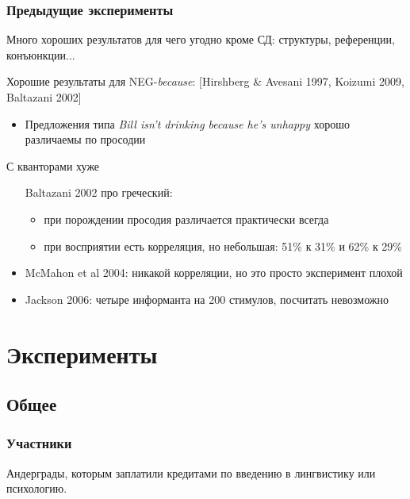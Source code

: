 \documentclass{beamer}
\begin{document}




\begin{frame}
    \frametitle{Предыдущие эксперименты}

    Много хороших результатов для чего угодно кроме СД: структуры, референции, конъюнкции...

    Хорошие результаты для NEG-\textit{because}: [Hirshberg \& Avesani 1997, Koizumi 2009, Baltazani 2002]
    \begin{itemize}
        \item Предложения типа \textit{Bill isn't drinking because he's unhappy} хорошо различаемы по просодии
    \end{itemize}
        
    С кванторами хуже
    \begin{itemize}
        \item [Baltazani 2002] про греческий:
        \begin{itemize}
            \item при порождении просодия различается практически всегда
            \item при восприятии есть корреляция, но небольшая: 51\% к 31\% и 62\% к 29\%
        \end{itemize}
        \item McMahon et al 2004: никакой корреляции, но это просто эксперимент плохой
        \item Jackson 2006: четыре информанта на 200 стимулов, посчитать невозможно
    \end{itemize}

\end{frame}

\section{Эксперименты}
\subsection{Общее}

\begin{frame}
    \frametitle{Участники}
    
    Андерграды, которым заплатили кредитами по введению в лингвистику или психологию.
    
\end{frame}
\end{document}
